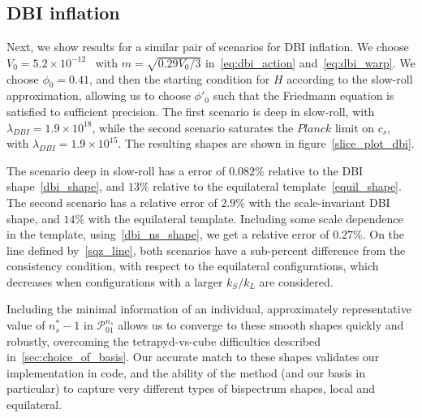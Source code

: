 \documentclass[a4paper,12pt]{extarticle}
\newcommand{\Lnsboth}{\mathcal{P}^{n_s}_{01}}
\begin{document}
\subsection{DBI inflation}
Next, we show results for a similar pair of scenarios for DBI inflation.
We choose $V_{0}={5.2\times10^{-12}}$~%
with $m=\sqrt{0.29V_0/3}$
in~\eqref{eq:dbi_action} and~\eqref{eq:dbi_warp}.
We choose $\phi_0=0.41$, and then the starting condition
for $H$ according to the slow-roll approximation,
allowing us to choose $\phi'_0$ such that the Friedmann
equation is satisfied to sufficient precision.
The first scenario is deep in slow-roll, with $\lambda_{DBI}=1.9\times10^{18}$, while
the second scenario saturates the $\textit{Planck}$
limit on $c_s$, with $\lambda_{DBI}=1.9\times10^{15}$.
The resulting shapes are shown in figure~\ref{slice_plot_dbi}.


The scenario deep in slow-roll has a error of $0.082\%$
relative to the DBI shape~\eqref{dbi_shape},
and $13\%$
relative to the equilateral template~\eqref{equil_shape}.
The second scenario has a relative error of $2.9\%$
with the scale-invariant DBI shape, and $14\%$ with the equilateral template.
Including some scale dependence in the template,
using~\eqref{dbi_ns_shape}, we get a relative error of $0.27\%$.
On the line defined by~\eqref{sqz_line},
both scenarios have a sub-percent difference from the
consistency condition, with respect to the equilateral configurations,
which decreases when configurations with a larger $k_S/k_L$ are considered.

Including the minimal information of an individual, approximately
representative value of $n_s^{*}-1$
in $\Lnsboth$ allows us to converge to these smooth shapes quickly
and robustly, overcoming the tetrapyd-vs-cube difficulties described
in~\ref{sec:choice_of_basis}. Our accurate match to these shapes validates our
implementation in code, and the ability of the method
(and our basis in particular) to capture very different types of
bispectrum shapes, local and equilateral.
\end{document}
